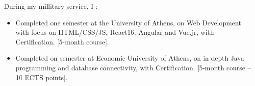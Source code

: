 
During my millitary service, I :
\begin{itemize}
    \item Completed one semester at the University of Athens, on Web Development with focus on HTML/CSS/JS, React16, Angular and Vue.jr, with Certification. [5-month course].
    \item Completed on semester at Economic University of Athens, on in depth Java programming and database connectivity, with Certification. [5-month course – 10 ECTS points].

\end{itemize}


